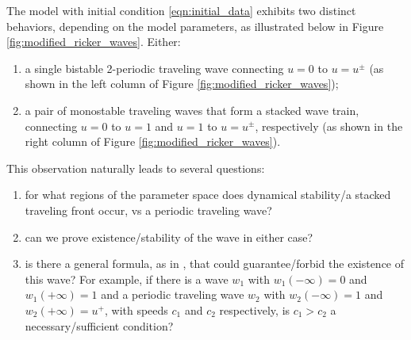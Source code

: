 \documentclass{article}
\theoremstyle{definition}
\numberwithin{equation}{section}
\begin{document}
The model with initial condition \eqref{eqn:initial_data} exhibits two distinct behaviors, depending on the model parameters, as illustrated below in Figure \ref{fig:modified_ricker_waves}. Either:
\begin{enumerate}[Outcome 1.]
  \item a single bistable 2-periodic traveling wave connecting $u=0$ to $u=u^\pm$ (as shown in the left column of Figure \ref{fig:modified_ricker_waves});
  \item a pair of monostable traveling waves that form a stacked wave train, connecting $u=0$ to $u=1$ and $u=1$ to $u=u^\pm$, respectively (as shown in the right column of Figure \ref{fig:modified_ricker_waves}).
\end{enumerate}
This observation naturally leads to several questions:
\begin{enumerate}[Q1.]
  \item for what regions of the parameter space does dynamical stability/a stacked traveling front occur, vs a periodic traveling wave?
  \item can we prove existence/stability of the wave in either case?
  \item is there a general formula, as in \cite{wang2002}, that could guarantee/forbid the existence of this wave? For example, if there is a wave $w_1$ with $w_1(-\infty)=0$ and $w_1(+\infty)=1$ and a periodic traveling wave $w_2$ with $w_2(-\infty)=1$ and $w_2(+\infty)=u^+$, with speeds $c_1$ and $c_2$ respectively, is $c_1>c_2$ a necessary/sufficient condition?
\end{enumerate}
\end{document}
